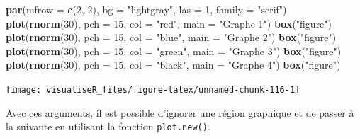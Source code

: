\documentclass[]{article}
\newenvironment{Shaded}{\begin{snugshade}}{\end{snugshade}}
\newcommand{\DataTypeTok}[1]{\textcolor[rgb]{0.13,0.29,0.53}{#1}}
\newcommand{\DecValTok}[1]{\textcolor[rgb]{0.00,0.00,0.81}{#1}}
\newcommand{\KeywordTok}[1]{\textcolor[rgb]{0.13,0.29,0.53}{\textbf{#1}}}
\newcommand{\NormalTok}[1]{#1}
\newcommand{\StringTok}[1]{\textcolor[rgb]{0.31,0.60,0.02}{#1}}
\begin{document}
\begin{Shaded}
\begin{Highlighting}[]
\KeywordTok{par}\NormalTok{(}\DataTypeTok{mfrow =} \KeywordTok{c}\NormalTok{(}\DecValTok{2}\NormalTok{, }\DecValTok{2}\NormalTok{), }\DataTypeTok{bg =} \StringTok{"lightgray"}\NormalTok{, }\DataTypeTok{las =} \DecValTok{1}\NormalTok{, }\DataTypeTok{family =} \StringTok{"serif"}\NormalTok{)}
\KeywordTok{plot}\NormalTok{(}\KeywordTok{rnorm}\NormalTok{(}\DecValTok{30}\NormalTok{), }\DataTypeTok{pch =} \DecValTok{15}\NormalTok{, }\DataTypeTok{col =} \StringTok{"red"}\NormalTok{, }\DataTypeTok{main =} \StringTok{"Graphe 1"}\NormalTok{)}
\KeywordTok{box}\NormalTok{(}\StringTok{"figure"}\NormalTok{)}
\KeywordTok{plot}\NormalTok{(}\KeywordTok{rnorm}\NormalTok{(}\DecValTok{30}\NormalTok{), }\DataTypeTok{pch =} \DecValTok{15}\NormalTok{, }\DataTypeTok{col =} \StringTok{"blue"}\NormalTok{, }\DataTypeTok{main =} \StringTok{"Graphe 2"}\NormalTok{)}
\KeywordTok{box}\NormalTok{(}\StringTok{"figure"}\NormalTok{)}
\KeywordTok{plot}\NormalTok{(}\KeywordTok{rnorm}\NormalTok{(}\DecValTok{30}\NormalTok{), }\DataTypeTok{pch =} \DecValTok{15}\NormalTok{, }\DataTypeTok{col =} \StringTok{"green"}\NormalTok{, }\DataTypeTok{main =} \StringTok{"Graphe 3"}\NormalTok{)}
\KeywordTok{box}\NormalTok{(}\StringTok{"figure"}\NormalTok{)}
\KeywordTok{plot}\NormalTok{(}\KeywordTok{rnorm}\NormalTok{(}\DecValTok{30}\NormalTok{), }\DataTypeTok{pch =} \DecValTok{15}\NormalTok{, }\DataTypeTok{col =} \StringTok{"black"}\NormalTok{, }\DataTypeTok{main =} \StringTok{"Graphe 4"}\NormalTok{)}
\KeywordTok{box}\NormalTok{(}\StringTok{"figure"}\NormalTok{)}
\end{Highlighting}
\end{Shaded}

\begin{center}\texttt{[image: visualiseR\_files/figure-latex/unnamed-chunk-116-1]} \end{center}

Avec ces arguments, il est possible d'ignorer une région graphique et de passer à la suivante en utilisant la fonction \texttt{plot.new()}.
\end{document}
